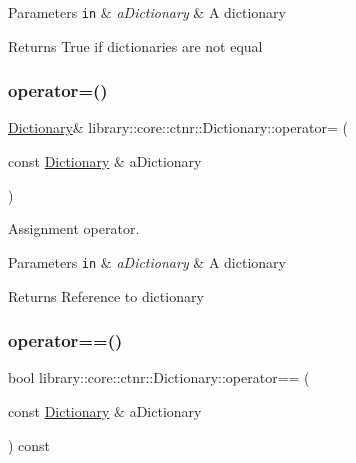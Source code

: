 \begin{DoxyParams}[1]{Parameters}
\mbox{\tt in}  & {\em a\+Dictionary} & A dictionary \\
\hline
\end{DoxyParams}
\begin{DoxyReturn}{Returns}
True if dictionaries are not equal 
\end{DoxyReturn}
\mbox{\label{classlibrary_1_1core_1_1ctnr_1_1_dictionary_abb23ad41d33d3e89e55d0fb831b8fac3}} 
\subsubsection{\texorpdfstring{operator=()}{operator=()}}
{\footnotesize\ttfamily \hyperlink{classlibrary_1_1core_1_1ctnr_1_1_dictionary}{Dictionary}\& library\+::core\+::ctnr\+::\+Dictionary\+::operator= (\begin{DoxyParamCaption}\item[{const \hyperlink{classlibrary_1_1core_1_1ctnr_1_1_dictionary}{Dictionary} \&}]{a\+Dictionary }\end{DoxyParamCaption})}



Assignment operator. 


\begin{DoxyParams}[1]{Parameters}
\mbox{\tt in}  & {\em a\+Dictionary} & A dictionary \\
\hline
\end{DoxyParams}
\begin{DoxyReturn}{Returns}
Reference to dictionary 
\end{DoxyReturn}
\mbox{\label{classlibrary_1_1core_1_1ctnr_1_1_dictionary_ab4d5377a537b57f061a2a56e9bd86b47}} 
\subsubsection{\texorpdfstring{operator==()}{operator==()}}
{\footnotesize\ttfamily bool library\+::core\+::ctnr\+::\+Dictionary\+::operator== (\begin{DoxyParamCaption}\item[{const \hyperlink{classlibrary_1_1core_1_1ctnr_1_1_dictionary}{Dictionary} \&}]{a\+Dictionary }\end{DoxyParamCaption}) const}



